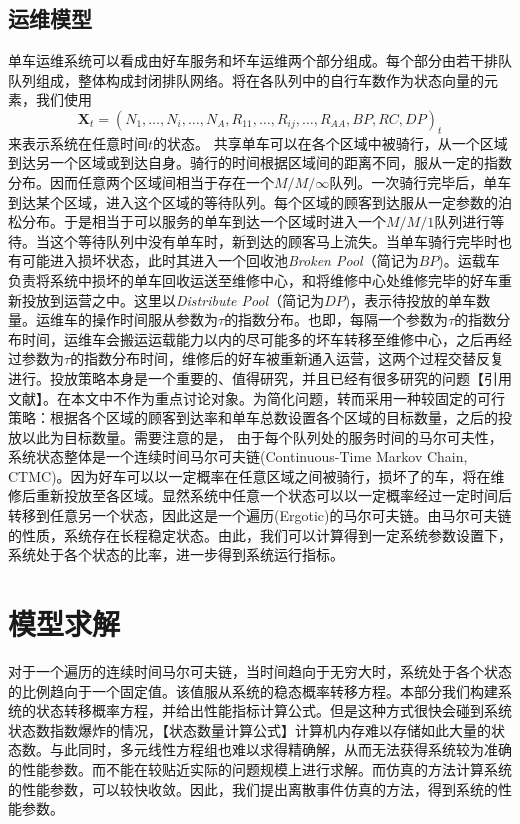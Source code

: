 \documentclass{article}
\begin{document}
\subsection{运维模型}
单车运维系统可以看成由好车服务和坏车运维两个部分组成。每个部分由若干排队队列组成，整体构成封闭排队网络。将在各队列中的自行车数作为状态向量的元素，我们使用$$\boldsymbol{X}_t = (N_1, \dots, N_{i}, \dots, N_A, R_{11}, \dots, R_{ij}, \dots, R_{AA}, BP, RC, DP)_t$$ 来表示系统在任意时间$t$的状态。
共享单车可以在各个区域中被骑行，从一个区域到达另一个区域或到达自身。骑行的时间根据区域间的距离不同，服从一定的指数分布。因而任意两个区域间相当于存在一个$M/M/\infty$队列。一次骑行完毕后，单车到达某个区域，进入这个区域的等待队列。每个区域的顾客到达服从一定参数的泊松分布。于是相当于可以服务的单车到达一个区域时进入一个$M/M/1$队列进行等待。当这个等待队列中没有单车时，新到达的顾客马上流失。当单车骑行完毕时也有可能进入损坏状态，此时其进入一个回收池\textit{Broken Pool}（简记为$BP$)。运载车负责将系统中损坏的单车回收运送至维修中心，和将维修中心处维修完毕的好车重新投放到运营之中。这里以\textit{Distribute Pool}（简记为$DP$)，表示待投放的单车数量。运维车的操作时间服从参数为$\tau$的指数分布。也即，每隔一个参数为$\tau$的指数分布时间，运维车会搬运运载能力以内的尽可能多的坏车转移至维修中心，之后再经过参数为$\tau$的指数分布时间，维修后的好车被重新通入运营，这两个过程交替反复进行。投放策略本身是一个重要的、值得研究，并且已经有很多研究的问题【引用文献】。在本文中不作为重点讨论对象。为简化问题，转而采用一种较固定的可行策略：根据各个区域的顾客到达率和单车总数设置各个区域的目标数量，之后的投放以此为目标数量。需要注意的是，%
由于每个队列处的服务时间的马尔可夫性，系统状态整体是一个连续时间马尔可夫链(Continuous-Time Markov Chain, CTMC)。因为好车可以以一定概率在任意区域之间被骑行，损坏了的车，将在维修后重新投放至各区域。显然系统中任意一个状态可以以一定概率经过一定时间后转移到任意另一个状态，因此这是一个遍历(Ergotic)的马尔可夫链。由马尔可夫链的性质，系统存在长程稳定状态。由此，我们可以计算得到一定系统参数设置下，系统处于各个状态的比率，进一步得到系统运行指标。


\section{模型求解}
对于一个遍历的连续时间马尔可夫链，当时间趋向于无穷大时，系统处于各个状态的比例趋向于一个固定值。该值服从系统的稳态概率转移方程。本部分我们构建系统的状态转移概率方程，并给出性能指标计算公式。但是这种方式很快会碰到系统状态数指数爆炸的情况，【状态数量计算公式】计算机内存难以存储如此大量的状态数。与此同时，多元线性方程组也难以求得精确解，从而无法获得系统较为准确的性能参数。而不能在较贴近实际的问题规模上进行求解。而仿真的方法计算系统的性能参数，可以较快收敛。因此，我们提出离散事件仿真的方法，得到系统的性能参数。
\end{document}
